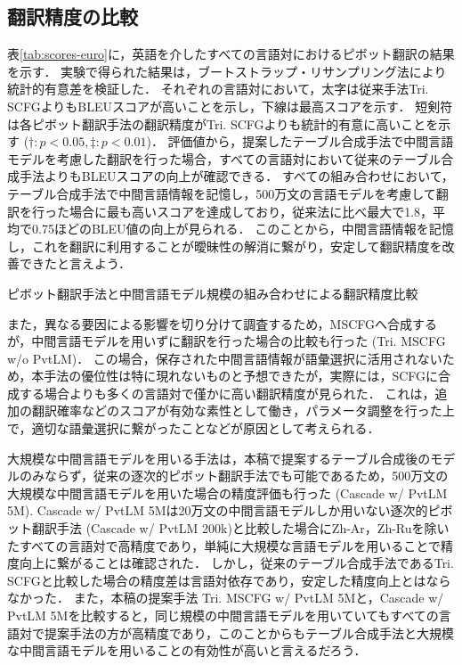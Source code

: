 \documentclass[japanese]{jnlp_1.4}
\begin{document}
\subsection{翻訳精度の比較}

表\ref{tab:scores-euro}に，英語を介したすべての言語対におけるピボット翻訳の結果を示す．
実験で得られた結果は，ブートストラップ・リサンプリング法\cite{koehn04bootstrap}により統計的有意差を検証した．
それぞれの言語対において，太字は従来手法Tri. SCFGよりもBLEUスコアが高いことを示し，下線は最高スコアを示す．
短剣符は各ピボット翻訳手法の翻訳精度がTri. SCFGよりも統計的有意に高いことを示す ($\dagger: p < 0.05, \ddagger: p < 0.01$)．
評価値から，提案したテーブル合成手法で中間言語モデルを考慮した翻訳を行った場合，すべての言語対において従来のテーブル合成手法よりもBLEUスコアの向上が確認できる．
すべての組み合わせにおいて，テーブル合成手法で中間言語情報を記憶し，500万文の言語モデルを考慮して翻訳を行った場合に最も高いスコアを達成しており，従来法に比べ最大で1.8，平均で0.75ほどのBLEU値の向上が見られる．
このことから，中間言語情報を記憶し，これを翻訳に利用することが曖昧性の解消に繋がり，安定して翻訳精度を改善できたと言えよう．

\begin{table}[b]
\caption{ピボット翻訳手法と中間言語モデル規模の組み合わせによる翻訳精度比較}
\label{tab:scores-euro}

\end{table}

また，異なる要因による影響を切り分けて調査するため，MSCFGへ合成するが，中間言語モデルを用いずに翻訳を行った場合の比較も行った (Tri. MSCFG w/o PvtLM)．
この場合，保存された中間言語情報が語彙選択に活用されないため，本手法の優位性は特に現れないものと予想できたが，実際には，SCFGに合成する場合よりも多くの言語対で僅かに高い翻訳精度が見られた．
これは，追加の翻訳確率などのスコアが有効な素性として働き，パラメータ調整を行った上で，適切な語彙選択に繋がったことなどが原因として考えられる．

大規模な中間言語モデルを用いる手法は，本稿で提案するテーブル合成後のモデルのみならず，従来の逐次的ピボット翻訳手法でも可能であるため，500万文の大規模な中間言語モデルを用いた場合の精度評価も行った (Cascade w/ PvtLM 5M).
Cascade w/ PvtLM 5Mは20万文の中間言語モデルしか用いない逐次的ピボット翻訳手法 (Cascade w/ PvtLM 200k)と比較した場合にZh-Ar，Zh-Ruを除いたすべての言語対で高精度であり，単純に大規模な言語モデルを用いることで精度向上に繋がることは確認された．
しかし，従来のテーブル合成手法であるTri. SCFGと比較した場合の精度差は言語対依存であり，安定した精度向上とはならなかった．
また，本稿の提案手法 Tri. MSCFG w/ PvtLM 5Mと，Cascade w/ PvtLM 5Mを比較すると，同じ規模の中間言語モデルを用いていてもすべての言語対で提案手法の方が高精度であり，このことからもテーブル合成手法と大規模な中間言語モデルを用いることの有効性が高いと言えるだろう．
\end{document}
